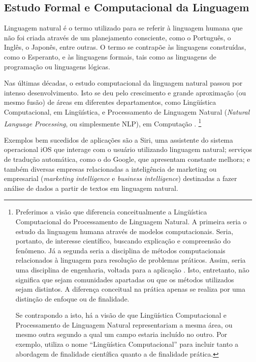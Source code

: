 \subsection{Estudo Formal e Computacional da Linguagem}

	Linguagem natural é o termo utilizado para se referir à linguagem humana que não foi criada através de um planejamento consciente, como o Português, o Inglês, o Japonês, entre outras.  O termo se contrapõe às linguagens construídas, como o Esperanto, e às linguagens formais, tais como as linguagens de programação ou linguagens lógicas.
	
	Nas últimas décadas, o estudo computacional da linguagem natural passou por intenso desenvolvimento. Isto se deu pelo crescimento e grande aproximação (ou mesmo fusão) de áreas em diferentes departamentos, como Lingüística Computacional, em Lingüística, e Processamento de Linguagem Natural (\textit{Natural Language Processing}, ou simplesmente NLP), em Computação \citep[pp.~xxi, 10]{Jurafsky:2009}.
		\footnote{Preferimos a visão que diferencia conceitualmente a Lingüística Computacional do Processamento de Linguagem Natural. A primeira seria o estudo da linguagem humana através de modelos computacionais. Seria, portanto, de interesse científico, buscando explicação e compreensão do fenômeno. Já a segunda seria a disciplina de métodos computacionais relacionados à linguagem para resolução de problemas práticos. Assim, seria uma disciplina de engenharia, voltada para a aplicação \citep{CarnegieMellon}. Isto, entretanto, não significa que sejam comunidades apartadas ou que os métodos utilizados sejam distintos. A diferença conceitual na prática apenas se realiza por uma distinção de enfoque ou de finalidade.
		
		Se contrapondo a isto, há a visão de que Lingüística Computacional e Processamento de Linguagem Natural representariam a mesma área, ou mesmo outra segundo a qual um campo estaria incluído no outro. Por exemplo, \citet[pp.~1--9]{Grishman:1986} utiliza o nome ``Lingüística Computacional'' para incluir tanto a abordagem de finalidade científica quanto a de finalidade prática.}
	
	Exemplos bem sucedidos de aplicações são a Siri, uma assistente do sistema operacional iOS que interage com o usuário utilizando linguagem natural; serviços de tradução automática, como o do Google, que apresentam constante melhora; e também diversas empresas relacionadas a inteligência de marketing ou empresarial (\textit{marketing intelligence} e \textit{business intelligence}) destinadas a fazer análise de dados a partir de textos em linguagem natural.

